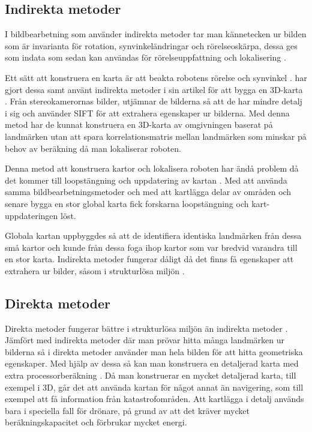 \subsection{Indirekta metoder}

I bildbearbetning som använder indirekta metoder tar man kännetecken ur bilden som är invarianta för rotation, synvinkeländringar och rörelseoskärpa, dessa ges som indata som sedan kan användas för rörelseuppfattning och lokalisering \citep{geospatial}. 

Ett sätt att konstruera en karta är att beakta robotens rörelse och synvinkel \citep{globalsubmaps}. \cite{mapbuildingsift} har gjort dessa samt använt indirekta metoder i sin artikel  för att bygga en 3D-karta \citep{mapbuildingsift}. Från stereokamerornas bilder, utjämnar de bilderna så att de har mindre detalj i sig och använder SIFT för att extrahera egenskaper ur bilderna. Med denna metod har de kunnat konstruera en 3D-karta av omgivningen baserat på landmärken utan att spara korrelationsmatris mellan landmärken som minskar på behov av beräkning då man lokaliserar roboten. 

Denna metod att konstruera kartor och lokalisera roboten har ändå problem då det kommer till loopstängning och uppdatering av kartan \citep{globalsubmaps}. Med att använda samma bildbearbetningsmetoder och med att kartlägga delar av områden och senare bygga en stor global karta fick forskarna loopstängning och kart-uppdateringen löst. 

Globala kartan uppbyggdes så att de identifiera identiska landmärken från dessa små kartor och kunde från dessa foga ihop kartor som var bredvid varandra till en stor karta. Indirekta metoder fungerar dåligt då det finns få egenskaper att extrahera ur bilder, såsom i strukturlösa miljön \citep{geospatial}.

\subsection{Direkta metoder}

Direkta metoder fungerar bättre i strukturlösa miljön än indirekta metoder \citep{Engel2014LSDSLAMLD}. Jämfört med indirekta metoder där man prövar hitta många landmärken ur bilderna så i direkta metoder använder man hela bilden för att hitta geometriska egenskaper. Med hjälp av dessa så kan man konstruera en detaljerad karta med extra processorberäkning \citep{geospatial}. Då man konstruerar en mycket detaljerad karta, till exempel i 3D, går det att använda kartan för något annat än navigering, som till exempel att få information från katastrofområden. Att kartlägga i detalj används bara i speciella fall för drönare, på grund av att det kräver mycket beräkningskapacitet och förbrukar mycket energi.

